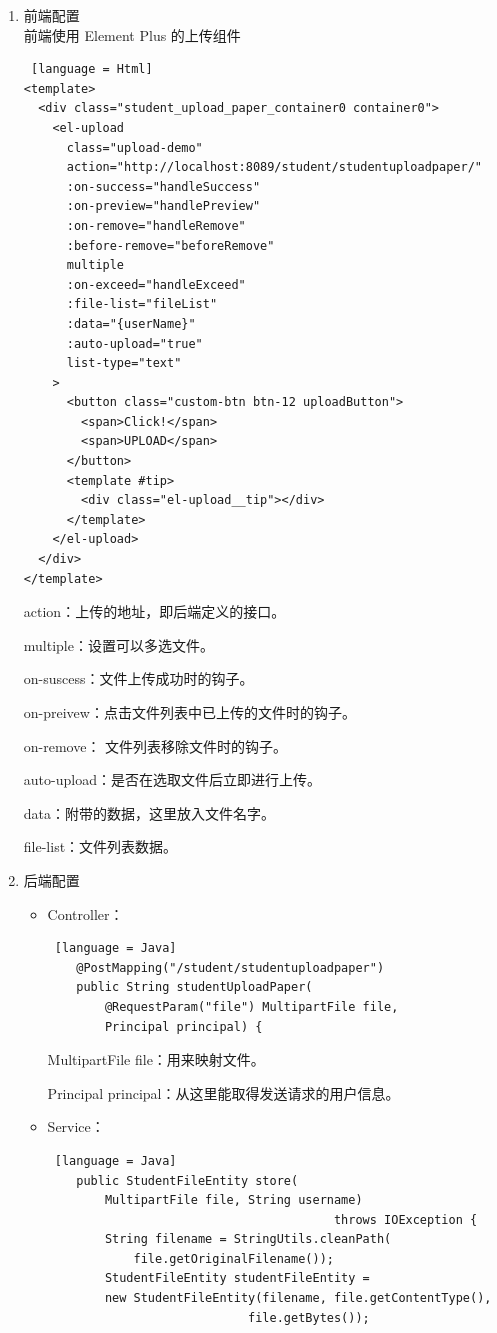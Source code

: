 \begin{enumerate}
  \item 前端配置\\
        前端使用 Element Plus 的上传组件
        \begin{lstlisting} [language = Html]
<template>
  <div class="student_upload_paper_container0 container0">
    <el-upload
      class="upload-demo"
      action="http://localhost:8089/student/studentuploadpaper/"
      :on-success="handleSuccess"
      :on-preview="handlePreview"
      :on-remove="handleRemove"
      :before-remove="beforeRemove"
      multiple
      :on-exceed="handleExceed"
      :file-list="fileList"
      :data="{userName}"
      :auto-upload="true"
      list-type="text"
    >
      <button class="custom-btn btn-12 uploadButton">
        <span>Click!</span>
        <span>UPLOAD</span>
      </button>
      <template #tip>
        <div class="el-upload__tip"></div>
      </template>
    </el-upload>
  </div>
</template>
    \end{lstlisting}
        action：上传的地址，即后端定义的接口。

        multiple：设置可以多选文件。

        on-suscess：文件上传成功时的钩子。

        on-preivew：点击文件列表中已上传的文件时的钩子。

        on-remove：	文件列表移除文件时的钩子。

        auto-upload：是否在选取文件后立即进行上传。

        data：附带的数据，这里放入文件名字。

        file-list：文件列表数据。

  \item 后端配置
        \begin{itemize}
          \item Controller：
                \begin{lstlisting} [language = Java]
    @PostMapping("/student/studentuploadpaper")
    public String studentUploadPaper(
        @RequestParam("file") MultipartFile file, 
        Principal principal) {
        \end{lstlisting}
                MultipartFile file：用来映射文件。

                Principal principal：从这里能取得发送请求的用户信息。
          \item Service：
                \begin{lstlisting} [language = Java]
    public StudentFileEntity store(
        MultipartFile file, String username) 
                                        throws IOException {
        String filename = StringUtils.cleanPath(
            file.getOriginalFilename());
        StudentFileEntity studentFileEntity = 
        new StudentFileEntity(filename, file.getContentType(), 
                            file.getBytes());


\end{lstlisting}
\end{itemize}
\end{enumerate}
